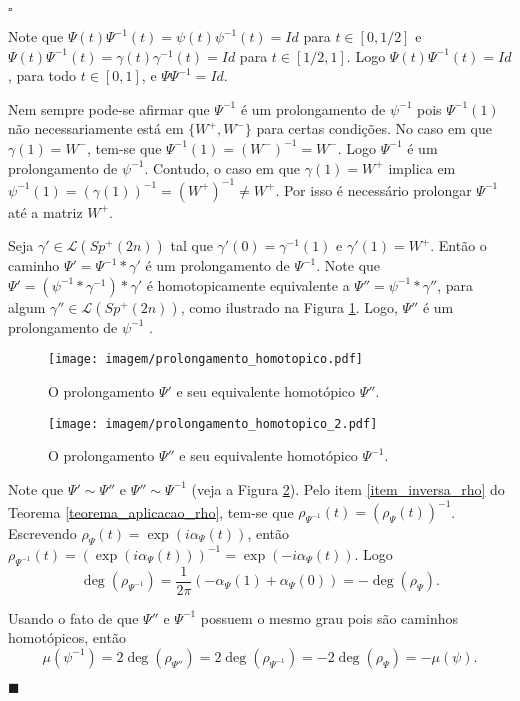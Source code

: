 \documentclass[12pt]{book}
\newenvironment{prova}[1]{$\square$ #1}{\hfill$\blacksquare$}
\newcommand{\caminhos}{\mathcal{L}}
\newcommand{\gruposimpleticonaodegenerado}[1]{Sp^{#1}(2n)}
\newcommand{\intervalo}{[0,1]}
\begin{document}
\begin{prova}
\begin{enumerate}
			Note que $\Psi(t)\Psi^{-1}(t) = \psi(t)\psi^{-1}(t) = Id$ para $t \in [0,1/2]$ e $\Psi(t)\Psi^{-1}(t) = \gamma(t)\gamma^{-1}(t) = Id$ para $t \in [1/2,1]$. Logo $\Psi(t)\Psi^{-1}(t) = Id$, para todo $t \in \intervalo$, e $\Psi\Psi^{-1} = Id$.
			
			Nem sempre pode-se afirmar que $\Psi^{-1}$ é um prolongamento de $\psi^{-1}$ pois $\Psi^{-1}(1)$ não necessariamente está em $\{W^{+},W^{-}\}$ para certas condições. No caso em que $\gamma(1)=W^{-}$, tem-se que $\Psi^{-1}(1) = (W^{-})^{-1}=W^{-}$. Logo $\Psi^{-1}$ é um prolongamento de $\psi^{-1}$. Contudo, o caso em que $\gamma(1)=W^{+}$ implica em $\psi^{-1}(1)= (\gamma(1))^{-1}=(W^{+})^{-1} \neq W^{+}$. Por isso é necessário prolongar $\Psi^{-1}$ até a matriz $W^{+}$.
			
			Seja $\gamma'\in \caminhos(\gruposimpleticonaodegenerado{+})$ tal que $\gamma'(0) = \gamma^{-1}(1)$ e $\gamma'(1)=W^{+}$. Então o caminho $\Psi'=\Psi^{-1}*\gamma'$ é um prolongamento de $\Psi^{-1}$. Note que $\Psi' = (\psi^{-1}*\gamma^{-1})*\gamma'$ é homotopicamente equivalente a $\Psi'' = \psi^{-1}*\gamma''$, para algum $\gamma''\in \caminhos(\gruposimpleticonaodegenerado{+})$, como ilustrado na Figura	 \ref{figura_prolongamento_homotopico}. Logo, $\Psi''$ é um prolongamento de $\psi^{-1}$ .  
			
			\begin{figure}[!h]
				\centering
				\texttt{[image: imagem/prolongamento\_homotopico.pdf]}
				\caption{O prolongamento $\Psi'$ e seu equivalente homotópico $\Psi''$.}
				\label{figura_prolongamento_homotopico}
			\end{figure}
			
			\begin{figure}[!h]
				\centering
				\texttt{[image: imagem/prolongamento\_homotopico\_2.pdf]}
				\caption{O prolongamento $\Psi''$ e seu equivalente homotópico $\Psi^{-1}$.}
				\label{figura_prolongamento_homotopico_2}
			\end{figure}
			
			
			
			Note que $\Psi'\sim \Psi''$ e $\Psi''\sim \Psi^{-1}$ (veja a Figura \ref{figura_prolongamento_homotopico_2}). Pelo item \ref{item_inversa_rho} do Teorema \ref{teorema_aplicacao_rho}, tem-se que $\rho_{\Psi^{-1}}(t) = (\rho_{\Psi}(t))^{-1}$. Escrevendo $\rho_{\Psi}(t) = \exp(i\alpha_{\Psi}(t))$, então $\rho_{\Psi^{-1}}(t) =(\exp(i\alpha_{\Psi}(t)))^{-1}= \exp(-i\alpha_{\Psi}(t))$. Logo 
			$$
			\deg(\rho_{\Psi^{-1}})=\frac{1}{2\pi}(-\alpha_{\Psi}(1)+\alpha_{\Psi}(0)) =  -\deg(\rho_{\Psi}).
			$$
			
			Usando o fato de que $\Psi''$ e $\Psi^{-1}$ possuem o mesmo grau pois são caminhos homotópicos, então
			$$
			\mu(\psi^{-1})=2\deg(\rho_{\Psi''}) = 2\deg(\rho_{\Psi^{-1}}) = -2\deg(\rho_{\Psi})= -\mu(\psi).
			$$
		\end{enumerate}
	\end{prova}
\end{document}
